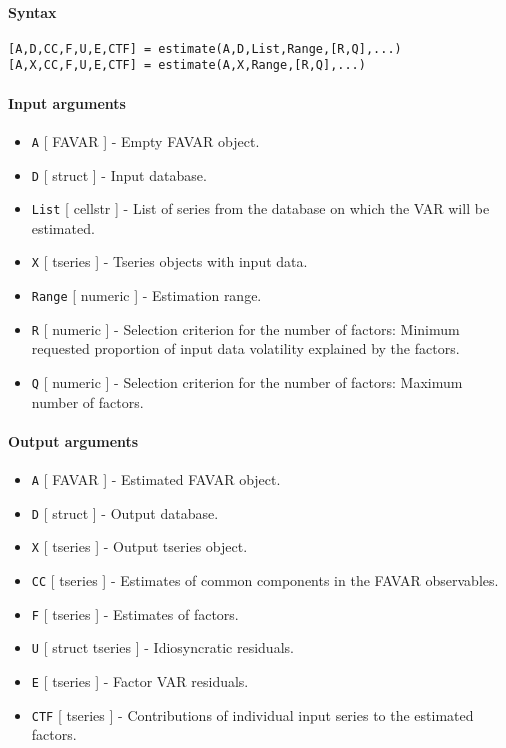 


	\paragraph{Syntax}\label{syntax}

\begin{verbatim}
[A,D,CC,F,U,E,CTF] = estimate(A,D,List,Range,[R,Q],...)
[A,X,CC,F,U,E,CTF] = estimate(A,X,Range,[R,Q],...)
\end{verbatim}

\paragraph{Input arguments}\label{input-arguments}

\begin{itemize}
\item
  \texttt{A} {[} FAVAR {]} - Empty FAVAR object.
\item
  \texttt{D} {[} struct {]} - Input database.
\item
  \texttt{List} {[} cellstr {]} - List of series from the database on
  which the VAR will be estimated.
\item
  \texttt{X} {[} tseries {]} - Tseries objects with input data.
\item
  \texttt{Range} {[} numeric {]} - Estimation range.
\item
  \texttt{R} {[} numeric {]} - Selection criterion for the number of
  factors: Minimum requested proportion of input data volatility
  explained by the factors.
\item
  \texttt{Q} {[} numeric {]} - Selection criterion for the number of
  factors: Maximum number of factors.
\end{itemize}

\paragraph{Output arguments}\label{output-arguments}

\begin{itemize}
\item
  \texttt{A} {[} FAVAR {]} - Estimated FAVAR object.
\item
  \texttt{D} {[} struct {]} - Output database.
\item
  \texttt{X} {[} tseries {]} - Output tseries object.
\item
  \texttt{CC} {[} tseries {]} - Estimates of common components in the
  FAVAR observables.
\item
  \texttt{F} {[} tseries {]} - Estimates of factors.
\item
  \texttt{U} {[} struct \textbar{} tseries {]} - Idiosyncratic
  residuals.
\item
  \texttt{E} {[} tseries {]} - Factor VAR residuals.
\item
  \texttt{CTF} {[} tseries {]} - Contributions of individual input
  series to the estimated factors.
\end{itemize}

